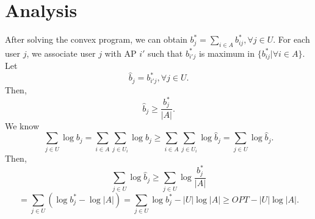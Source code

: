 \section{Analysis}
	After solving the convex program, we can obtain $b_j^* = \sum_{i \in A} b_{ij}^*, \forall j \in U.$
	For each user $j$, we associate user $j$ with AP $i'$ such that $b_{i'j}^*$ is maximum in $\{b_{ij}^*|\forall i \in A \}.$ 
	Let $$\hat{b}_j = b_{i'j}^*, \forall j \in U.$$
	Then, $$\hat{b}_j \ge \frac{b_j^*}{|A|}.$$
	We know $$\sum_{j \in U} \log{b_j} = \sum_{i \in A} \sum_{j \in U_i} \log{b_j} \ge \sum_{i \in A} \sum_{j \in U_i} \log{\hat{b}_j} = \sum_{j \in U} \log{\hat{b}_j}.$$
	Then, $$\sum_{j \in U} \log{\hat{b}_j} \ge \sum_{j \in U} \log{\frac{b_j^*}{|A|}} $$ $$ = \sum_{j \in U} (\log{b_j^*}-\log{|A|}) = \sum_{j \in U} \log{b_j^*} - |U|\log{|A|} \ge OPT - |U|\log{|A|}.$$